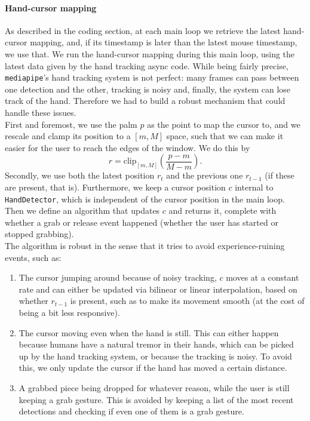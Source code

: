 \documentclass[a4paper, 11pt, twocolumn]{IEEEtran}
\begin{document}
    \paragraph*{Hand-cursor mapping} As described in the coding section, at each main loop we retrieve the latest hand-cursor mapping, and, if its timestamp is later than the latest mouse timestamp, we use that. We run the hand-cursor mapping during this main loop, using the latest data given by the hand tracking async code.
    While being fairly precise, \texttt{mediapipe}'s hand tracking system is not perfect: many frames can pass between one detection and the other, tracking is noisy and, finally, the system can lose track of the hand. Therefore we had to build a robust mechanism that could handle these issues.\\
    First and foremost, we use the palm $p$ as the point to map the cursor to, and we rescale and clamp its position to a $[m, M]$ space, such that we can make it easier for the user to reach the edges of the window.
    We do this by
    \begin{equation}
        r = \mathrm{clip}_{[m,M]}(\frac{p - m}{M - m}).
    \end{equation}
    Secondly, we use both the latest position $r_t$ and the previous one $r_{t-1}$ (if these are present, that is). Furthermore, we keep a cursor position $c$ internal to \texttt{HandDetector}, which is independent of the cursor position in the main loop. Then we define an algorithm that updates $c$ and returns it, complete with whether a grab or release event happened (whether the user has started or stopped grabbing).\\
    The algorithm is robust in the sense that it tries to avoid experience-ruining events, such as:
    \begin{enumerate}
        \item The cursor jumping around because of noisy tracking, $c$ moves at a constant rate and can either be updated via bilinear or linear interpolation, based on whether $r_{t-1}$ is present, such as to make its movement smooth (at the cost of being a bit less responsive).
        \item The cursor moving even when the hand is still. This can either happen because humans have a natural tremor in their hands, which can be picked up by the hand tracking system, or because the tracking is noisy. To avoid this, we only update the cursor if the hand has moved a certain distance.
        \item A grabbed piece being dropped for whatever reason, while the user is still keeping a grab gesture. This is avoided by keeping a list of the most recent detections and checking if even one of them is a grab gesture.
    \end{enumerate}
    
\end{document}
